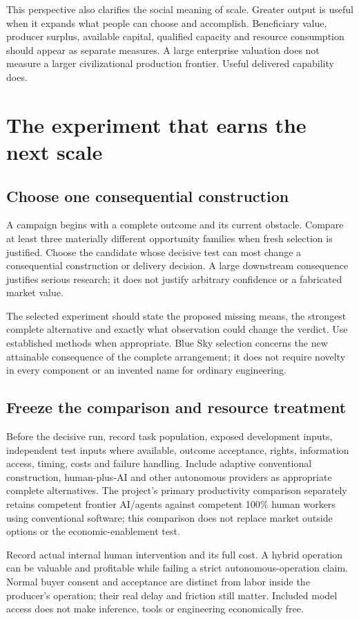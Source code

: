 \documentclass[11pt,letterpaper]{article}
\begin{document}
This perspective also clarifies the social meaning of scale. Greater output is useful when it expands what people can choose and accomplish. Beneficiary value, producer surplus, available capital, qualified capacity and resource consumption should appear as separate measures. A large enterprise valuation does not measure a larger civilizational production frontier. Useful delivered capability does.

\section{The experiment that earns the next scale}
\subsection{Choose one consequential construction}
A campaign begins with a complete outcome and its current obstacle. Compare at least three materially different opportunity families when fresh selection is justified. Choose the candidate whose decisive test can most change a consequential construction or delivery decision. A large downstream consequence justifies serious research; it does not justify arbitrary confidence or a fabricated market value.

The selected experiment should state the proposed missing means, the strongest complete alternative and exactly what observation could change the verdict. Use established methods when appropriate. Blue Sky selection concerns the new attainable consequence of the complete arrangement; it does not require novelty in every component or an invented name for ordinary engineering.

\subsection{Freeze the comparison and resource treatment}
Before the decisive run, record task population, exposed development inputs, independent test inputs where available, outcome acceptance, rights, information access, timing, costs and failure handling. Include adaptive conventional construction, human-plus-AI and other autonomous providers as appropriate complete alternatives. The project's primary productivity comparison separately retains competent frontier AI/agents against competent 100\% human workers using conventional software; this comparison does not replace market outside options or the economic-enablement test.

Record actual internal human intervention and its full cost. A hybrid operation can be valuable and profitable while failing a strict autonomous-operation claim. Normal buyer consent and acceptance are distinct from labor inside the producer's operation; their real delay and friction still matter. Included model access does not make inference, tools or engineering economically free.
\end{document}
